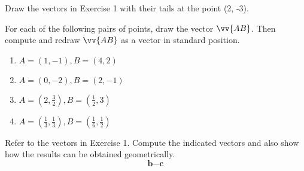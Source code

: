 \documentclass[11pt,letterpaper,boxed]{hmcpset}
\begin{document}

\begin{problem}[\#2] 
Draw the vectors in Exercise 1 with their tails at the point (2, -3).
\end{problem}



\pagebreak


\begin{problem}[\#5] 
For each of the following pairs of points, draw the vector $\vv{AB}$. Then compute and redraw $\vv{AB}$ as a vector in standard position.
\begin{enumerate}
\item $A=(1,-1), B=(4,2)$
\item $A=(0, -2), B=(2,-1)$
\item $A=(2,\frac32), B=(\frac12,3)$
\item $A=(\frac13,\frac13), B=(\frac16,\frac12)$
\end{enumerate}
\end{problem}



\pagebreak


\begin{problem}[\#8] 
Refer to the vectors in Exercise 1. Compute the indicated vectors and also show how the results can be obtained geometrically.\\
\[
\textbf{b}-\textbf{c}
\]
\end{problem}



\pagebreak

\end{document}
